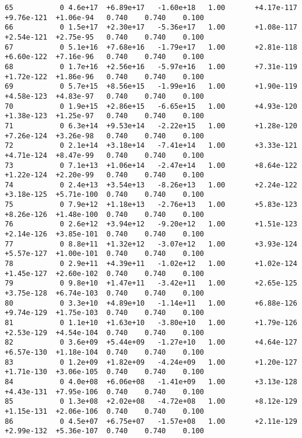 \documentclass[12pt]{article}
\numberwithin{equation}{section}
\begin{document}
\begin{lstlisting}
65           0 4.6e+17  +6.89e+17   -1.60e+18   1.00       +4.17e-117  +9.76e-121  +1.06e-94   0.740    0.740    0.100
66           0 1.5e+17  +2.30e+17   -5.36e+17   1.00       +1.08e-117  +2.54e-121  +2.75e-95   0.740    0.740    0.100
67           0 5.1e+16  +7.68e+16   -1.79e+17   1.00       +2.81e-118  +6.60e-122  +7.16e-96   0.740    0.740    0.100
68           0 1.7e+16  +2.56e+16   -5.97e+16   1.00       +7.31e-119  +1.72e-122  +1.86e-96   0.740    0.740    0.100
69           0 5.7e+15  +8.56e+15   -1.99e+16   1.00       +1.90e-119  +4.58e-123  +4.83e-97   0.740    0.740    0.100
70           0 1.9e+15  +2.86e+15   -6.65e+15   1.00       +4.93e-120  +1.38e-123  +1.25e-97   0.740    0.740    0.100
71           0 6.3e+14  +9.53e+14   -2.22e+15   1.00       +1.28e-120  +7.26e-124  +3.26e-98   0.740    0.740    0.100
72           0 2.1e+14  +3.18e+14   -7.41e+14   1.00       +3.33e-121  +4.71e-124  +8.47e-99   0.740    0.740    0.100
73           0 7.1e+13  +1.06e+14   -2.47e+14   1.00       +8.64e-122  +1.22e-124  +2.20e-99   0.740    0.740    0.100
74           0 2.4e+13  +3.54e+13   -8.26e+13   1.00       +2.24e-122  +3.18e-125  +5.71e-100  0.740    0.740    0.100
75           0 7.9e+12  +1.18e+13   -2.76e+13   1.00       +5.83e-123  +8.26e-126  +1.48e-100  0.740    0.740    0.100
76           0 2.6e+12  +3.94e+12   -9.20e+12   1.00       +1.51e-123  +2.14e-126  +3.85e-101  0.740    0.740    0.100
77           0 8.8e+11  +1.32e+12   -3.07e+12   1.00       +3.93e-124  +5.57e-127  +1.00e-101  0.740    0.740    0.100
78           0 2.9e+11  +4.39e+11   -1.02e+12   1.00       +1.02e-124  +1.45e-127  +2.60e-102  0.740    0.740    0.100
79           0 9.8e+10  +1.47e+11   -3.42e+11   1.00       +2.65e-125  +3.75e-128  +6.74e-103  0.740    0.740    0.100
80           0 3.3e+10  +4.89e+10   -1.14e+11   1.00       +6.88e-126  +9.74e-129  +1.75e-103  0.740    0.740    0.100
81           0 1.1e+10  +1.63e+10   -3.80e+10   1.00       +1.79e-126  +2.53e-129  +4.54e-104  0.740    0.740    0.100
82           0 3.6e+09  +5.44e+09   -1.27e+10   1.00       +4.64e-127  +6.57e-130  +1.18e-104  0.740    0.740    0.100
83           0 1.2e+09  +1.82e+09   -4.24e+09   1.00       +1.20e-127  +1.71e-130  +3.06e-105  0.740    0.740    0.100
84           0 4.0e+08  +6.06e+08   -1.41e+09   1.00       +3.13e-128  +4.43e-131  +7.95e-106  0.740    0.740    0.100
85           0 1.3e+08  +2.02e+08   -4.72e+08   1.00       +8.12e-129  +1.15e-131  +2.06e-106  0.740    0.740    0.100
86           0 4.5e+07  +6.75e+07   -1.57e+08   1.00       +2.11e-129  +2.99e-132  +5.36e-107  0.740    0.740    0.100

\end{lstlisting}
\end{document}
